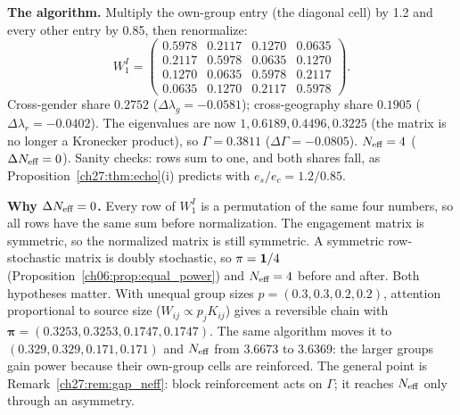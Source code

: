 \documentclass[../solutions_manual.tex]{subfiles}
\begin{document}
 \textbf{The algorithm.} Multiply the own-group entry (the diagonal cell) by 1.2 and every other entry by 0.85, then renormalize:
\[
W^I_1 = \begin{pmatrix}
0.5978 & 0.2117 & 0.1270 & 0.0635\\
0.2117 & 0.5978 & 0.0635 & 0.1270\\
0.1270 & 0.0635 & 0.5978 & 0.2117\\
0.0635 & 0.1270 & 0.2117 & 0.5978
\end{pmatrix}.
\]
Cross-gender share $0.2752$ ($\Delta\lambda_g = -0.0581$); cross-geography share $0.1905$ ($\Delta\lambda_r = -0.0402$). The eigenvalues are now $1, 0.6189, 0.4496, 0.3225$ (the matrix is no longer a Kronecker product), so $\Gamma = 0.3811$ ($\Delta\Gamma = -0.0805$). $N_{\text{eff}} = 4$ ($\Delta N_{\text{eff}} = 0$). Sanity checks: rows sum to one, and both shares fall, as Proposition~\ref{ch27:thm:echo}(i) predicts with $e_s/e_c = 1.2/0.85$.

 \textbf{Why $\Delta N_{\text{eff}} = 0$.} Every row of $W^I_1$ is a permutation of the same four numbers, so all rows have the same sum before normalization. The engagement matrix is symmetric, so the normalized matrix is still symmetric. A symmetric row-stochastic matrix is doubly stochastic, so $\pi = \mathbf{1}/4$ (Proposition~\ref{ch06:prop:equal_power}) and $N_{\text{eff}} = 4$ before and after. Both hypotheses matter. With unequal group sizes $p = (0.3, 0.3, 0.2, 0.2)$, attention proportional to source size ($W_{ij} \propto p_jK_{ij}$) gives a reversible chain with $\boldsymbol{\pi} = (0.3253, 0.3253, 0.1747, 0.1747)$. The same algorithm moves it to $(0.329, 0.329, 0.171, 0.171)$ and $N_{\text{eff}}$ from 3.6673 to 3.6369: the larger groups gain power because their own-group cells are reinforced. The general point is Remark~\ref{ch27:rem:gap_neff}: block reinforcement acts on $\Gamma$; it reaches $N_{\text{eff}}$ only through an asymmetry.

\end{document}
